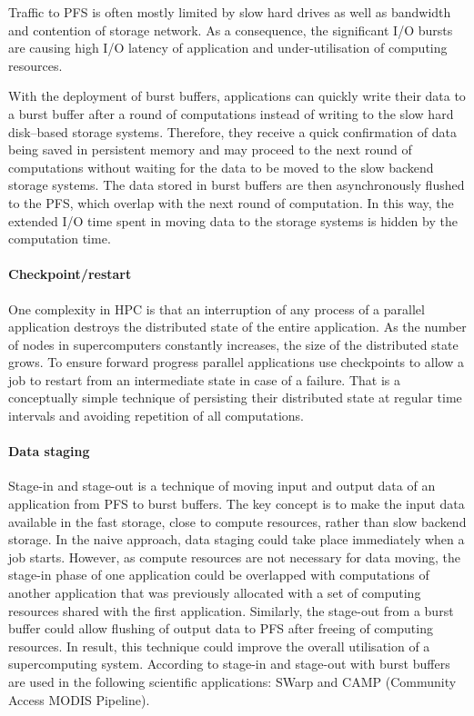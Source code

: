 \documentclass[thesis-en.tex]{subfiles}
\begin{document}
Traffic to PFS is often mostly limited by slow hard drives as well as bandwidth and contention of storage network. As a consequence, the significant I/O bursts are causing high I/O latency of application and under-utilisation of computing resources.

With the deployment of burst buffers, applications can quickly write their data to a burst buffer after a round of computations instead of writing to the slow hard disk--based storage systems. Therefore, they receive a quick confirmation of data being saved in persistent memory and may proceed to the next round of computations without waiting for the data to be moved to the slow backend storage systems. The data stored in burst buffers are then asynchronously flushed to the PFS, which overlap with the next round of computation. In this way, the extended I/O time spent in moving data to the storage systems is hidden by the computation time.

\paragraph{Checkpoint/restart}
One complexity in HPC is that an interruption of any process of a parallel application destroys the distributed state of the entire application. As the number of nodes in supercomputers constantly increases, the size of the distributed state grows. To ensure forward progress parallel applications use checkpoints to allow a job to restart from an intermediate state in case of a failure. That is a conceptually simple technique of persisting their distributed state at regular time intervals and avoiding repetition of all computations.

\paragraph{Data staging}
Stage-in and stage-out is a technique of moving input and output data of an application from PFS to burst buffers. The key concept is to make the input data available in the fast storage, close to compute resources, rather than slow backend storage. In the naive approach, data staging could take place immediately when a job starts. However, as compute resources are not necessary for data moving, the stage-in phase of one application could be overlapped with computations of another application that was previously allocated with a set of computing resources shared with the first application. Similarly, the stage-out from a burst buffer could allow flushing of output data to PFS after freeing of computing resources. In result, this technique could improve the overall utilisation of a supercomputing system. According to \cite{osti_1544343} stage-in and stage-out with burst buffers are used in the following scientific applications: SWarp and CAMP (Community Access MODIS Pipeline).
\end{document}
